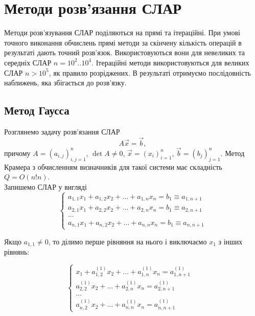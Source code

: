 \section{Методи розв’язання СЛАР}

Методи розв’язування СЛАР поділяються на прямі та ітераційні. При умові точного виконання обчислень прямі методи за скінчену кількість операцій в результаті дають точний розв’язок. Використовуються вони для невеликих та середніх СЛАР $n=10^2..10^4$. Ітераційні методи використовуються для великих СЛАР $n>10^5$, як правило розріджених. В результаті отримуємо
послідовність наближень, яка збігається до розв’язку. \\

\subsection{Метод Гаусса}

Розглянемо задачу розв'язання СЛАР
\begin{equation}
	\label{eq:3.1}
	A \vec x = \vec b,
\end{equation}
причому $A = (a_{i,j})_{i,j=1}^n$, $\det A \ne 0$, $\vec x = (x_i)_{i=1}^n$, $\vec b = (b_j)_{j=1}^n$. Метод Крамера з обчисленням визначників для такої системи має складність $Q = O(n! n)$. \\

Запишемо СЛАР у вигляді
\begin{equation}
	\label{eq:3.2}
	\left\{
		\begin{matrix}
			a_{1,1} x_1 + a_{1,2} x_2 + \ldots + a_{1,n} x_n = b_1 \equiv a_{1,n+1} \\
			a_{2,1} x_1 + a_{2,2} x_2 + \ldots + a_{2,n} x_n = b_1 \equiv a_{2,n+1} \\
			\ldots \\
			a_{n,1} x_1 + a_{n,2} x_2 + \ldots + a_{n,n} x_n = b_1 \equiv a_{n,n+1}
		\end{matrix}
	\right.
\end{equation}

Якщо $a_{1,1} \ne 0$, то ділимо перше рівняння на нього і виключаємо $x_1$ з інших рівнянь: 

\[\left\{
	\begin{aligned}
		x_1 + a_{1,2}^{(1)} x_2 + \ldots + a_{1,n}^{(1)} x_n = a_{1,n+1}^{(1)} &\\
		a_{2,2}^{(1)} x_2 + \ldots + a_{2,n}^{(1)} x_n = a_{2,n+1}^{(1)} &\\
		\ldots &\\
		a_{n,2}^{(1)} x_2 + \ldots + a_{n,n}^{(1)} x_n = a_{n,n+1}^{(1)}&
	\end{aligned}
\right.\]

